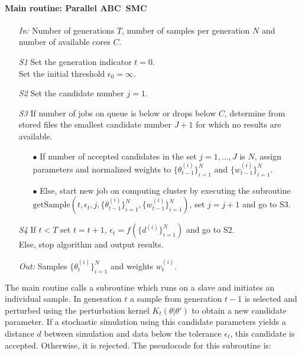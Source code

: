 \documentclass[10pt,letterpaper]{article}
\begin{document}
\paragraph{Main routine: Parallel ABC~SMC}
\begin{itemize}
\item[\it In:]
Number of generations $T$, number of samples per generation $N$ and number of available cores $C$.
%
\item[\it S1]
Set the generation indicator $t=0$. \\
Set the initial threshold $\epsilon_{0} = \infty$.\\
%
\item[\it S2] Set the candidate number $j = 1$.
\item[\it S3] If number of jobs on queue is below or drops below $C$, determine from stored files the smallest candidate number $J+1$ for which no results are available.
	\begin{itemize}
	\item[$\bullet$] If number of accepted candidates in the set $j = 1,\ldots,J$ is $N$, assign parameters and normalized weights to $\{\theta^{(i)}_{t-1}\}_{i=1}^N$ and $\{w^{(i)}_{t-1}\}_{i=1}^N$.
	\item[$\bullet$] Else, start new job on computing cluster by executing the subroutine $\mathrm{getSample}\!\left(t,\epsilon_t,j,\{\theta^{(i)}_{t-1}\}_{i=1}^N,\{w^{(i)}_{t-1}\}_{i=1}^N\right)$, set $j = j +1$ and go to S3.
	\end{itemize}
\item[\it S4] If $t < T$ set $t = t+1$, $\epsilon_t = f(\{d^{(i)}\}_{i=1}^N)$ and go to S2. \\
Else, stop algorithm and output results.
\item[\it Out:] Samples $\{\theta^{(i)}_{t}\}_{i=1}^N$ and weights $w^{(i)}_{t}$.
\end{itemize}
%
The main routine calls a subroutine which runs on a slave and initiates an individual sample. In generation $t$ a sample from generation $t-1$ is selected and perturbed using the perturbation kernel $K_t(\theta|\theta')$ to obtain a new candidate parameter. If a stochastic simulation using this candidate parameters yields a distance $d$ between simulation and data below the tolerance $\epsilon_t$, this candidate is accepted. Otherwise, it is rejected. The pseudocode for this subroutine is:
%
\end{document}
